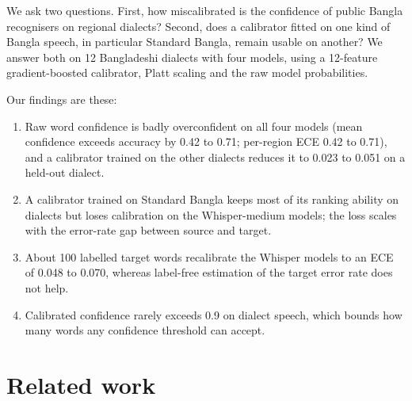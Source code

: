 \documentclass[10pt]{article}
\begin{document}
We ask two questions. First, how miscalibrated is the confidence of public Bangla recognisers on regional dialects? Second, does a calibrator fitted on one kind of Bangla speech, in particular Standard Bangla, remain usable on another? We answer both on 12 Bangladeshi dialects with four models, using a 12-feature gradient-boosted calibrator, Platt scaling and the raw model probabilities.


Our findings are these:


\begin{enumerate}

\item Raw word confidence is badly overconfident on all four models (mean confidence exceeds accuracy by 0.42 to 0.71; per-region ECE 0.42 to 0.71), and a calibrator trained on the other dialects reduces it to 0.023 to 0.051 on a held-out dialect.

\item A calibrator trained on Standard Bangla keeps most of its ranking ability on dialects but loses calibration on the Whisper-medium models; the loss scales with the error-rate gap between source and target.

\item About 100 labelled target words recalibrate the Whisper models to an ECE of 0.048 to 0.070, whereas label-free estimation of the target error rate does not help.

\item Calibrated confidence rarely exceeds 0.9 on dialect speech, which bounds how many words any confidence threshold can accept.

\end{enumerate}

\section{Related work}
\end{document}

